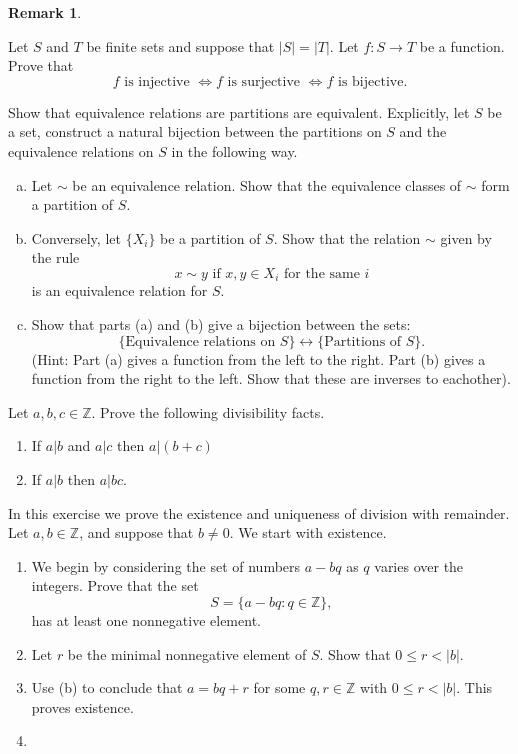 \documentclass[11pt]{article}
\newtheorem*{remark}{Remark}
\newcommand{\bZ}{\mathbb{Z}}
\begin{document}
\begin{enumerate}
\begin{remark}
\end{remark}
\item{
Let $S$ and $T$ be finite sets and suppose that $|S| = |T|$.  Let $f:S\to T$ be a function.  Prove that
\[f\text{ is injective }\Leftrightarrow f\text{ is surjective }\Leftrightarrow f\text{ is bijective.}\]
}
\item Show that equivalence relations are partitions are equivalent.  Explicitly, let $S$ be a set, construct a natural bijection between the partitions on $S$ and the equivalence relations on $S$ in the following way.
\begin{enumerate}[(a)]
\item Let $\sim$ be an equivalence relation.  Show that the equivalence classes of $\sim$ form a partition of $S$.
\item Conversely, let $\{X_i\}$ be a partition of $S$.  Show that the relation $\sim$ given by the rule
\[x\sim y\text{ if }x,y\in X_i\text{ for the same }i\]
is an equivalence relation for $S$.
\item{Show that parts (a) and (b) give a bijection between the sets:
\[\{\text{Equivalence relations on }S\}\longleftrightarrow\{\text{Partitions of }S\}.\]
(Hint: Part (a) gives a function from the left to the right.  Part (b) gives a function from the right to the left.  Show that these are inverses to eachother).
}
\end{enumerate}
\item{Let $a,b,c\in\bZ$.  Prove the following divisibility facts.
\begin{enumerate}
  \item{If $a|b$ and $a|c$ then $a|(b+c)$}
  \item{If $a|b$ then $a|bc$.}
\end{enumerate}
\item{
In this exercise we prove the existence and uniqueness of division with remainder.  Let $a,b\in\bZ$, and suppose that $b\not=0$.  We start with existence.
\begin{enumerate}
  \item{
  We begin by considering the set of numbers $a-bq$ as $q$ varies over the integers.  Prove that the set
  \[S = \{a-bq : q\in\bZ\},\]
  has at least one nonnegative element.
  }
  \item{
  Let $r$ be the minimal nonnegative element of $S$.  Show that $0\le r< |b|$.
  }
  \item{
  Use (b) to conclude that $a = bq+r$ for some $q,r\in\bZ$ with $0\le r<|b|$.  This proves existence.
  }
  \item{
}
\end{enumerate}}}
\end{enumerate}
\end{document}
